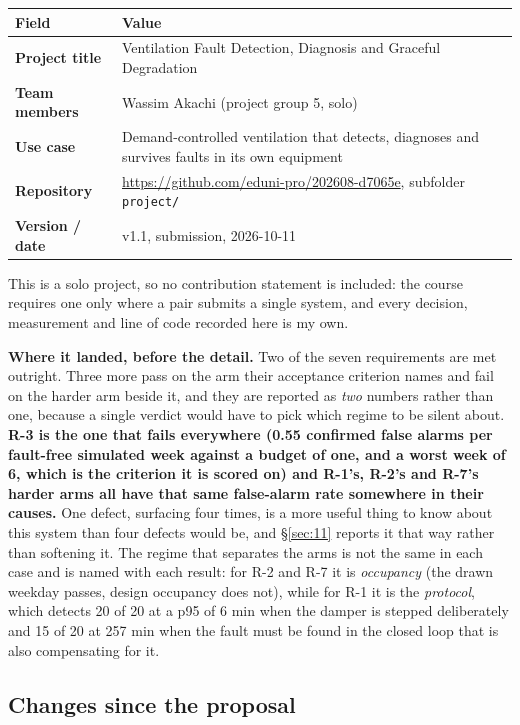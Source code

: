 \begin{longtable}[]{@{}
  >{\raggedright\arraybackslash}p{}
  >{\raggedright\arraybackslash}p{}@{}}
\toprule
\textbf{Field} & \textbf{Value} \\
\midrule
\endhead
\textbf{Project title} & Ventilation Fault Detection, Diagnosis and Graceful Degradation \\
\textbf{Team members} & Wassim Akachi (project group 5, solo) \\
\textbf{Use case} & Demand-controlled ventilation that detects, diagnoses and survives faults in
its own equipment \\
\textbf{Repository} & \url{https://github.com/eduni-pro/202608-d7065e}, subfolder \texttt{project/} \\
\textbf{Version / date} & v1.1, submission, 2026-10-11 \\
\bottomrule
\end{longtable}

This is a solo project, so no contribution statement is included: the course requires one only
where a pair submits a single system, and every decision, measurement and line of code recorded
here is my own.

\textbf{Where it landed, before the detail.} Two of the seven requirements are met outright. Three
more pass on the arm their acceptance criterion names and fail on the harder arm beside it, and
they are reported as \emph{two} numbers rather than one, because a single verdict would have to
pick which regime to be silent about. \textbf{R-3 is the one that fails everywhere (0.55
confirmed false alarms per fault-free simulated week against a budget of one, and a worst week of
6, which is the criterion it is scored on) and R-1's, R-2's and R-7's harder arms all have that
same false-alarm rate somewhere in their causes.} One defect,
surfacing four times, is a more useful thing to know about this system than four defects would be,
and §\ref{sec:11} reports it that way rather than softening it. The regime that separates the arms is not
the same in each case and is named with each result: for R-2 and R-7 it is \emph{occupancy} (the
drawn weekday passes, design occupancy does not), while for R-1 it is the \emph{protocol}, which
detects 20 of 20 at a p95 of 6 min when the damper is stepped deliberately and 15 of 20 at 257 min
when the fault must be found in the closed loop that is also compensating for it.

\subsection{Changes since the proposal}\label{sec:1.1}

